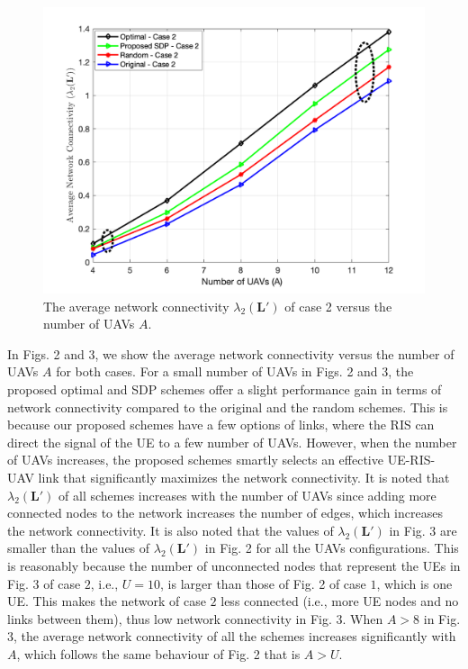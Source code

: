\documentclass[conference]{IEEEtran}
\begin{document}
\begin{figure}[t!]
			\begin{center}
				\includegraphics[width=0.95\linewidth]{FigUAVcase2.png}
				\caption{The average network connectivity $\lambda_2(\mathbf L')$ of case 2 versus the number of UAVs $A$.}
     \vspace{-5.5mm}
			\end{center}
   \label{fig2_case2}
		\end{figure}
  
  



  
In Figs. 2 and 3, we show the average network connectivity versus the number of UAVs $A$ for both cases. For a small number of UAVs in Figs. 2  and 3, the proposed optimal and SDP schemes offer a slight performance gain in terms of  network connectivity compared to the original and the random schemes. This is because our proposed schemes have a few options of links, where the RIS can direct the signal of the UE to a few number of UAVs. However, when the number of UAVs increases, the proposed schemes smartly selects an effective UE-RIS-UAV link  that significantly maximizes the network connectivity. It is noted that $\lambda_2(\mathbf L')$ of all schemes increases  with the number of UAVs since adding more connected nodes to the network increases the number of edges, which increases the network connectivity. It is also noted that the values of $\lambda_2(\mathbf L')$ in Fig. 3 are smaller than the values of  $\lambda_2(\mathbf L')$ in Fig. 2 for all the UAVs configurations. This is reasonably because the number of unconnected nodes that represent the UEs in Fig. 3 of case $2$, i.e., $U=10$,  is larger than those of  Fig. 2 of case $1$, which is one UE.  This makes the network of case $2$ less connected (i.e., more UE nodes and no links between them), thus low  network connectivity in Fig. 3. When $A>8$ in Fig. 3, the  average network connectivity of all the schemes increases   significantly with $A$, which follows the same behaviour of  Fig. 2 that is $A>U$.
\end{document}
